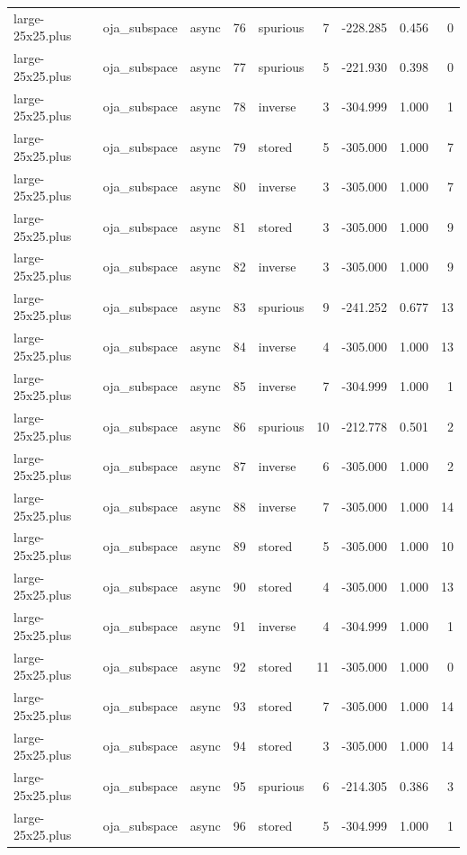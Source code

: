 \begin{tabular}{lllrlrrrr}
large-25x25.plus & oja\_subspace & async & 76 & spurious & 7 & -228.285 & 0.456 & 0 \\
large-25x25.plus & oja\_subspace & async & 77 & spurious & 5 & -221.930 & 0.398 & 0 \\
large-25x25.plus & oja\_subspace & async & 78 & inverse & 3 & -304.999 & 1.000 & 1 \\
large-25x25.plus & oja\_subspace & async & 79 & stored & 5 & -305.000 & 1.000 & 7 \\
large-25x25.plus & oja\_subspace & async & 80 & inverse & 3 & -305.000 & 1.000 & 7 \\
large-25x25.plus & oja\_subspace & async & 81 & stored & 3 & -305.000 & 1.000 & 9 \\
large-25x25.plus & oja\_subspace & async & 82 & inverse & 3 & -305.000 & 1.000 & 9 \\
large-25x25.plus & oja\_subspace & async & 83 & spurious & 9 & -241.252 & 0.677 & 13 \\
large-25x25.plus & oja\_subspace & async & 84 & inverse & 4 & -305.000 & 1.000 & 13 \\
large-25x25.plus & oja\_subspace & async & 85 & inverse & 7 & -304.999 & 1.000 & 1 \\
large-25x25.plus & oja\_subspace & async & 86 & spurious & 10 & -212.778 & 0.501 & 2 \\
large-25x25.plus & oja\_subspace & async & 87 & inverse & 6 & -305.000 & 1.000 & 2 \\
large-25x25.plus & oja\_subspace & async & 88 & inverse & 7 & -305.000 & 1.000 & 14 \\
large-25x25.plus & oja\_subspace & async & 89 & stored & 5 & -305.000 & 1.000 & 10 \\
large-25x25.plus & oja\_subspace & async & 90 & stored & 4 & -305.000 & 1.000 & 13 \\
large-25x25.plus & oja\_subspace & async & 91 & inverse & 4 & -304.999 & 1.000 & 1 \\
large-25x25.plus & oja\_subspace & async & 92 & stored & 11 & -305.000 & 1.000 & 0 \\
large-25x25.plus & oja\_subspace & async & 93 & stored & 7 & -305.000 & 1.000 & 14 \\
large-25x25.plus & oja\_subspace & async & 94 & stored & 3 & -305.000 & 1.000 & 14 \\
large-25x25.plus & oja\_subspace & async & 95 & spurious & 6 & -214.305 & 0.386 & 3 \\
large-25x25.plus & oja\_subspace & async & 96 & stored & 5 & -304.999 & 1.000 & 1 \\

\end{tabular}
